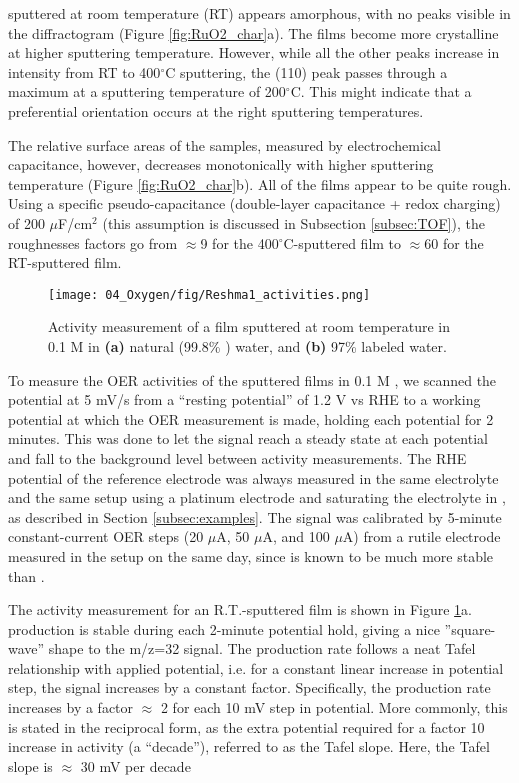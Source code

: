  sputtered at room temperature (RT) appears amorphous, with no peaks visible in the diffractogram (Figure \ref{fig:RuO2_char}a). The films become more crystalline at higher sputtering temperature. However, while all the other peaks increase in intensity from RT to 400$^\circ$C sputtering, the (110) peak passes through a maximum at a sputtering temperature of 200$^\circ$C. This might indicate that a preferential orientation occurs at the right sputtering temperatures.

The relative surface areas of the samples, measured by electrochemical capacitance, however, decreases monotonically with higher sputtering temperature (Figure \ref{fig:RuO2_char}b). All of the films appear to be quite rough. Using a specific pseudo-capacitance (double-layer capacitance + redox charging) of 200 $\mu$F/cm$^2$ (this assumption is discussed in Subsection \ref{subsec:TOF})\cite{Yoshida2013}, the roughnesses factors go from $\approx$9 for the 400$^\circ$C-sputtered film to $\approx$60 for the RT-sputtered film. %

\begin{figure}[t]
	\texttt{[image: 04\_Oxygen/fig/Reshma1\_activities.png]}
	\caption{Activity measurement of a  film sputtered at room temperature in 0.1 M  in \textbf{(a)} natural (99.8\% ) water, and \textbf{(b)} 97\%  labeled water.}
	\label{fig:Reshma1_activities}
\end{figure}


To measure the OER activities of the sputtered films in 0.1 M , we scanned the potential at 5 mV/s from a ``resting potential'' of 1.2 V vs RHE to a working potential at which the OER measurement is made, holding each potential for 2 minutes. This was done to let the  signal reach a steady state at each potential and fall to the background level between activity measurements. The RHE potential of the reference electrode was always measured in the same electrolyte and the same setup using a platinum electrode and saturating the electrolyte in , as described in Section \ref{subsec:examples}. The  signal was calibrated by 5-minute constant-current OER steps (20 $\mu$A, 50 $\mu$A, and 100 $\mu$A) from a rutile  electrode measured in the setup on the same day, since  is known to be much more stable than \cite{Reier2017}.

The activity measurement for an R.T.-sputtered film is shown in Figure \ref{fig:Reshma1_activities}a.  production is stable during each 2-minute potential hold, giving a nice ''square-wave'' shape to the m/z=32 signal. The  production rate follows a neat Tafel relationship with applied potential, i.e. for a constant linear increase in potential step, the  signal increases by a constant factor. Specifically, the  production rate increases by a factor $\approx$ 2 for each 10 mV step in potential. More commonly, this is stated in the reciprocal form, as the extra potential required for a factor 10 increase in activity (a ``decade''), referred to as the Tafel slope. Here, the Tafel slope is $\approx$ 30 mV per decade

